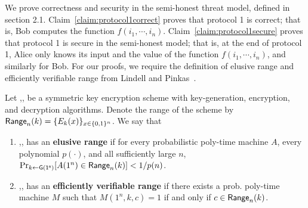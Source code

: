 We prove correctness and security in the semi-honest threat model,
defined in section 2.1.  Claim~\ref{claim:protocol1correct}
proves that protocol 1 is
correct; that is, Bob computes the function $f(i_1,\cdots,i_n)$.
Claim~\ref{claim:protocol1secure} proves that protocol 1 is secure
in the semi-honest model; that is, at the end of protocol 1, Alice only
knows its input and the value of the function $f(i_1,\cdots,i_n)$, and
similarly for Bob. For our proofs, we require the definition of elusive range and
efficiently verifiable range from Lindell and Pinkas~\cite{LP04}.
\begin{definition}
Let ,, be a symmetric key encryption scheme
with key-generation, encryption, and decryption algorithms.
Denote the range of the scheme by
$\mathsf{Range}_n(k)=\{E_k(x)\}_{x\in\{0,1\}^n}$. We say that
\begin{enumerate}
	\item {},, has an \textbf{elusive range}
	if for every probabilistic poly-time machine $A$, every
	polynomial $p(\cdot)$, and all sufficiently large $n$,
	$\Pr_{k{\gets}\mathsf{G(1^n)}}[A(1^n)\in\mathsf{Range}_n(k)]<1/p(n)$.

	\item {},, has an \textbf{efficiently
	verifiable range} if there exists a prob. poly-time
	machine $M$ such that $M(1^n,k,c)=1$ if and only if
	$c\in\mathsf{Range}_n(k)$.
\end{enumerate}
\end{definition}


